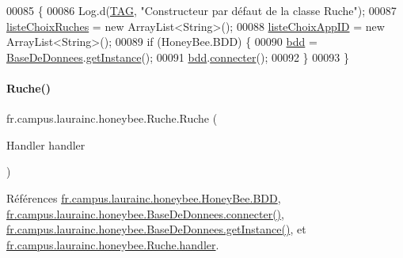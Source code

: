 \begin{DoxyCode}
00085                    \{
00086         Log.d(\hyperlink{classfr_1_1campus_1_1laurainc_1_1honeybee_1_1_ruche_a44739cbb0fa7451c1edc240a3f51c257}{TAG}, \textcolor{stringliteral}{"Constructeur par défaut de la classe Ruche"});
00087         \hyperlink{classfr_1_1campus_1_1laurainc_1_1honeybee_1_1_ruche_accb6ae9a3a546857525f0e1cdc023250}{listeChoixRuches} = \textcolor{keyword}{new} ArrayList<String>();
00088         \hyperlink{classfr_1_1campus_1_1laurainc_1_1honeybee_1_1_ruche_a839228c6a5015c4c3db018316e4e776f}{listeChoixAppID} = \textcolor{keyword}{new} ArrayList<String>();
00089         \textcolor{keywordflow}{if} (HoneyBee.BDD) \{
00090             \hyperlink{classfr_1_1campus_1_1laurainc_1_1honeybee_1_1_ruche_a0eb43a2b63fb83e9d5af6cd6b754c7da}{bdd} = \hyperlink{class_base_de_donnees}{BaseDeDonnees}.\hyperlink{class_base_de_donnees_a80028aa2b6b4fbf30fb2e36357b7d3d3}{getInstance}();
00091             \hyperlink{classfr_1_1campus_1_1laurainc_1_1honeybee_1_1_ruche_a0eb43a2b63fb83e9d5af6cd6b754c7da}{bdd}.\hyperlink{classfr_1_1campus_1_1laurainc_1_1honeybee_1_1_base_de_donnees_a08564ea7dccde161d6eac4b8879401bb}{connecter}();
00092         \}
00093     \}
\end{DoxyCode}
\mbox{\label{classfr_1_1campus_1_1laurainc_1_1honeybee_1_1_ruche_abb08f6c820fe60fd569bfabc8207ee94}} 
\paragraph{\texorpdfstring{Ruche()}{Ruche()}\hspace{0.1cm}{\footnotesize\ttfamily [2/4]}}
{\footnotesize\ttfamily fr.\+campus.\+laurainc.\+honeybee.\+Ruche.\+Ruche (\begin{DoxyParamCaption}\item[{Handler}]{handler }\end{DoxyParamCaption})}



Références \hyperlink{classfr_1_1campus_1_1laurainc_1_1honeybee_1_1_honey_bee_abfb4f6cc1c8bb793c37ccb8408abc51c}{fr.\+campus.\+laurainc.\+honeybee.\+Honey\+Bee.\+B\+DD}, \hyperlink{classfr_1_1campus_1_1laurainc_1_1honeybee_1_1_base_de_donnees_a08564ea7dccde161d6eac4b8879401bb}{fr.\+campus.\+laurainc.\+honeybee.\+Base\+De\+Donnees.\+connecter()}, \hyperlink{classfr_1_1campus_1_1laurainc_1_1honeybee_1_1_base_de_donnees_a9c2484cfb87f90e46cf878eb7803abb2}{fr.\+campus.\+laurainc.\+honeybee.\+Base\+De\+Donnees.\+get\+Instance()}, et \hyperlink{classfr_1_1campus_1_1laurainc_1_1honeybee_1_1_ruche_a9689ca454694434549e5fffca876ffae}{fr.\+campus.\+laurainc.\+honeybee.\+Ruche.\+handler}.


